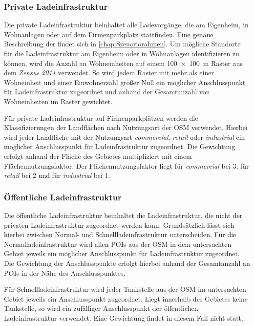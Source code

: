 \subsubsection{Private Ladeinfrastruktur}

Die private Ladeinfrastruktur beinhaltet alle Ladevorgänge, die am Eigenheim, in Wohnanlagen oder auf dem Firmenparkplatz stattfinden.
Eine genaue Beschreibung der \UCs findet sich in \autoref{chap:Szenariorahmen}.
Um mögliche Standorte für die Ladeinfrastruktur am Eigenheim oder in Wohnanlagen identifizieren zu können, wird die Anzahl an Wohneinheiten auf einem \SI{100 x 100}{\m} Raster aus dem \textit{Zensus 2011} \cite{StatistischesBundesamt2011} verwendet.
So wird jedem Raster mit mehr als einer Wohneinheit und einer Einwohnerzahl größer Null ein möglicher Anschlusspunkt für Ladeinfrastruktur zugeordnet und anhand der Gesamtanzahl von Wohneinheiten im Raster gewichtet. \medskip

Für private Ladeinfrastruktur auf Firmenparkplätzen werden die Klassifizierungen der Landflächen nach Nutzungsart der \gls{OSM} \cite{OpenStreetMapFoundation} verwendet.
Hierbei wird jeder Landfläche mit der Nutzungsart \textit{commercial}, \textit{retail} oder \textit{industrial} ein möglicher Anschlusspunkt für Ladeinfrastruktur zugeordnet.
Die Gewichtung erfolgt anhand der Fläche des Gebietes multipliziert mit einem Flächennutzungsfaktor.
Der Flächennutzungsfaktor liegt für \textit{commercial} bei \num{3}, für \textit{retail} bei \num{2} und für \textit{industrial} bei \num{1}.


\subsubsection{Öffentliche Ladeinfrastruktur}

Die öffentliche Ladeinfrastruktur beinhaltet die Ladeinfrastruktur, die nicht der privaten Ladeinfrastruktur zugeordnet werden kann.
Grundsätzlich lässt sich hierbei zwischen Normal- und Schnellladeinfrastruktur unterscheiden.
Für die Normalladeinfrastruktur wird allen \glspl{POI} aus der \gls{OSM} \cite{OpenStreetMapFoundation} in dem untersuchten Gebiet jeweils ein möglicher Anschlusspunkt für Ladeinfrastruktur zugeordnet.
Die Gewichtung der Anschlusspunkte erfolgt hierbei anhand der Gesamtanzahl an \glspl{POI} in der Nähe des Anschlusspunktes.\medskip

Für Schnellladeinfrastruktur wird jeder Tankstelle aus der \gls{OSM} \cite{OpenStreetMapFoundation} im untersuchten Gebiet jeweils ein Anschlusspunkt zugeordnet.
Liegt innerhalb des Gebietes keine Tankstelle, so wird ein zufälliger Anschlusspunkt der öffentlichen Ladeinfrastruktur verwendet.
Eine Gewichtung findet in diesem Fall nicht statt.



